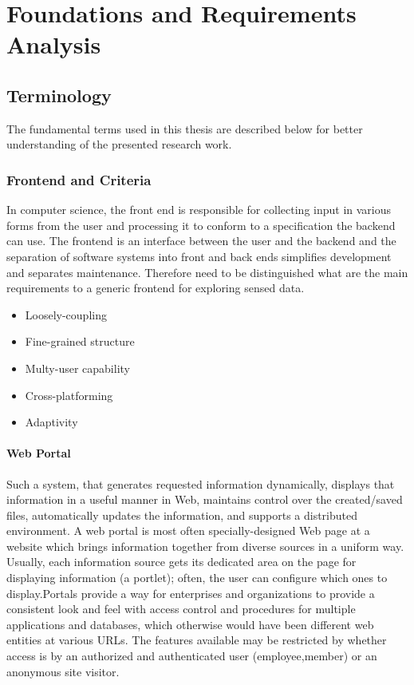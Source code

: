 \chapter{Foundations and Requirements Analysis}

\section{Terminology}
The fundamental terms used in this thesis are described below for better understanding of the presented research work.
\subsection {Frontend and Criteria}
In computer science, the front end is responsible for collecting input in various forms from the user and processing it to conform to a specification the backend can use. The frontend is an interface between the user and the backend\cite{wiki:xxx} and the separation of software systems into front and back ends simplifies development and separates maintenance. Therefore need to be distinguished what are the main requirements to a generic frontend for exploring sensed data.
\begin{itemize}
\item Loosely-coupling
\item Fine-grained structure
\item Multy-user capability
\item Cross-platforming
\item Adaptivity
\end{itemize}

\subsubsection {Web Portal}
Such a system, that generates requested information dynamically, displays that
information in a useful manner in Web, maintains control over the created/saved files, automatically updates
the information, and supports a distributed environment\cite{rezayat2000enterprise}.
A web portal is most often specially-designed Web page at a website which brings information together from diverse sources in a uniform way. Usually, each information source gets its dedicated area on the page for displaying information (a portlet); often, the user can configure which ones to display.Portals provide a way for enterprises and organizations to provide a consistent look and feel with access control and procedures for multiple applications and databases, which otherwise would have been different web entities at various URLs. The features available may be restricted by whether access is by an authorized and authenticated user (employee,member) or an anonymous site visitor\cite{wiki:portal}.

